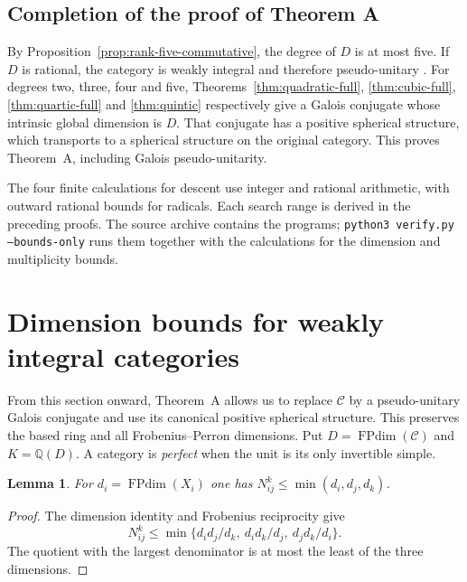 \documentclass[11pt,a4paper]{article}
\newtheorem{lemma}[theorem]{Lemma}
\numberwithin{equation}{section}
\begin{document}
\subsection{Completion of the proof of Theorem A}
By Proposition~\ref{prop:rank-five-commutative}, the degree of
$D$ is at most five. If $D$ is rational, the category is weakly integral
and therefore pseudo-unitary \cite[Proposition 8.24]{ENO}.
For degrees two, three, four and five, Theorems~\ref{thm:quadratic-full},
\ref{thm:cubic-full}, \ref{thm:quartic-full} and \ref{thm:quintic}
respectively give a Galois conjugate whose intrinsic global dimension
is $D$. That conjugate has a positive spherical structure, which
transports to a spherical structure on the original category.
This proves Theorem~A, including Galois pseudo-unitarity.

The four finite calculations for descent use integer and rational
arithmetic, with outward rational bounds for radicals. Each search
range is derived in the preceding proofs. The source archive contains
the programs; \texttt{python3 verify.py --bounds-only} runs them together
with the calculations for the dimension and multiplicity bounds.




\section{Dimension bounds for weakly integral categories}
\label{sec:classify}
From this section onward, Theorem~A allows us to replace $\mathcal C$
by a pseudo-unitary Galois conjugate and use its canonical positive
spherical structure. This preserves the based ring and all
Frobenius--Perron dimensions. Put $D=\operatorname{FPdim}(\mathcal C)$
and $K=\mathbb Q(D)$. A category is \emph{perfect} when the unit is its
only invertible simple.

\begin{lemma}\label{lem:mu-d}
For $d_i=\operatorname{FPdim}(X_i)$ one has $N_{ij}^k\le\min(d_i,d_j,d_k)$.
\end{lemma}
\begin{proof}
The dimension identity and Frobenius reciprocity give
\[
 N_{ij}^k\le\min\{d_i d_j/d_k,\ d_i d_k/d_j,\ d_j d_k/d_i\}.
\]
The quotient with the largest denominator is at most the least of the three dimensions.
\end{proof}
\end{document}
